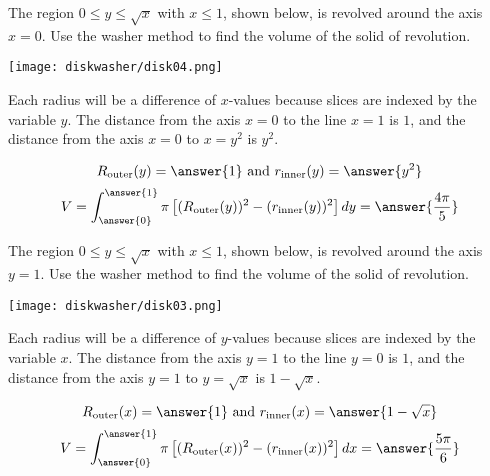 \documentclass{ximera}
\begin{document}
\begin{exercise}
The region $0 \leq y \leq \sqrt{x}$ with $x \leq 1$, shown below, is revolved around the axis $x=0$. Use the washer method to find the volume of the solid of revolution.
\begin{center}
\begin{image}
\texttt{[image: diskwasher/disk04.png]}
\end{image}
\end{center}
\begin{hint}
Each radius will be a difference of $x$-values because slices are indexed by the variable $y$.
The distance from the axis $x=0$ to the line $x=1$ is $1$, and the distance from the axis $x=0$ to $x = y^2$ is $y^2$.
\end{hint}
\begin{prompt}
\[ R_{\mathrm{outer}} (y) = \answer{1} \text{ and } r_{\mathrm{inner}}(y) = \answer{y^2} \]
\[ V = \int_{\answer{0}}^{\answer{1}} \pi  \left[ (R_{\mathrm{outer}}(y))^2 - (r_{\mathrm{inner}}(y))^2 \right] dy =  \answer{\frac{4\pi}{5}} \]
\end{prompt}

\end{exercise}

\begin{exercise}
The region $0 \leq y \leq \sqrt{x}$ with $x \leq 1$, shown below, is revolved around the axis $y=1$. Use the washer method to find the volume of the solid of revolution.
\begin{center}
\begin{image}
\texttt{[image: diskwasher/disk03.png]}
\end{image}
\end{center}
\begin{hint}
Each radius will be a difference of $y$-values because slices are indexed by the variable $x$.
The distance from the axis $y=1$ to the line $y=0$ is $1$, and the distance from the axis $y=1$ to $y = \sqrt{x}$ is $1 - \sqrt{x}$.
\end{hint}
\begin{prompt}
\[ R_{\mathrm{outer}} (x) = \answer{1} \text{ and } r_{\mathrm{inner}}(x) = \answer{1-\sqrt{x}} \]
\[ V = \int_{\answer{0}}^{\answer{1}} \pi  \left[ (R_{\mathrm{outer}}(x))^2 - (r_{\mathrm{inner}}(x))^2 \right] dx =  \answer{\frac{5\pi}{6}} \]
\end{prompt}
\end{exercise}
\end{document}

